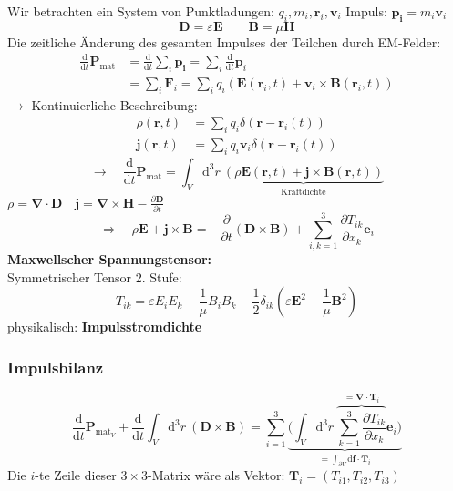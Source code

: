 \documentclass[titlepage,11pt,a4paper,ngerman]{report}
\newcommand{\tx}[1]{\textrm{#1}}
\newcommand{\ub}[1]{\underbrace{#1}}
\newcommand{\ob}[1]{\overbrace{#1}}
\newcommand{\dd}{\tx{d}}
\newcommand{\prt}[2]{\frac{\partial #1}{\partial #2}}
\newcommand{\prd}[2]{\frac{\tx{d} #1}{\tx{d} #2}}
\renewcommand{\vec}[1]{\boldsymbol{#1}}
\renewcommand{\epsilon}{\varepsilon}
\newcommand{\vabla}{\boldsymbol{\nabla}}
\begin{document}
Wir betrachten ein System von Punktladungen: $ q_i, m_i, \vec{r}_i, \vec{v}_i $
Impuls: $ \vec{p_i} = m_i \vec{v}_i $
\begin{equation*}
\vec{D} = \epsilon \vec{E} \qquad \vec{B} = \mu \vec{H}
\end{equation*}
Die zeitliche Änderung des gesamten Impulses der Teilchen durch EM-Felder:
\begin{align*}
\prd{}{t} \vec{P}_{\tx{mat}} &= \prd{}{t} \sum_i \vec{p_i} = \sum_i \prd{}{t} \vec{p}_i\\
&= \sum_i \vec{F}_i = \sum_i q_i \left(\vec{E}(\vec{r}_i, t) + \vec{v}_i \times \vec{B}(\vec{r}_i, t)\right)
\end{align*}
$ \rightarrow $ Kontinuierliche Beschreibung:
\begin{align*}
\rho(\vec{r},t) &= \sum_i q_i \delta(\vec{r} - \vec{r}_i(t))\\
\vec{j}(\vec{r},t) &= \sum_i q_i \vec{v}_i \delta(\vec{r} - \vec{r}_i(t))
\end{align*}
\begin{equation*}
\rightarrow \quad \prd{}{t} \vec{P}_{\tx{mat}} = \int_V \dd^3 r \ \ub{\left(\rho \vec{E}(\vec{r},t) + \vec{j} \times \vec{B}(\vec{r},t)\right)}_{\tx{Kraftdichte}}
\end{equation*}
$ \rho = \vabla \cdot \vec{D} \quad \vec{j} = \vabla \times \vec{H} - \prt{\vec{D}}{t} $
\begin{equation*}
\Rightarrow \quad \rho \vec{E} + \vec{j} \times \vec{B} = - \prt{}{t} (\vec{D} \times \vec{B}) + \sum_{i,k=1}^{3} \prt{T_{ik}}{x_k} \vec{e}_i
\end{equation*}
\textbf{Maxwellscher Spannungstensor:}\\[5pt]
Symmetrischer Tensor 2. Stufe:
\begin{equation*}
T_{ik} = \epsilon E_i E_k - \frac{1}{\mu} B_i B_k - \frac{1}{2} \delta_{ik}(\epsilon \vec{E}^2 - \frac{1}{\mu} \vec{B}^2)
\end{equation*}
physikalisch: \textbf{Impulsstromdichte}

\subsubsection{Impulsbilanz}

\begin{equation*}
\prd{}{t} \vec{P}_{\tx{mat}_V} + \prd{}{t} \int_V \dd^3 r \ (\vec{D} \times \vec{B}) = \sum_{i=1}^{3} \ub{\Bigg(\int_{V} \dd^3 r\ \ob{\sum_{k=1}^{3} \prt{T_{ik}}{x_k}}^{= \vabla \cdot \vec{T}_i} \vec{e}_i \Bigg)}_{= \int_{\partial V} \dd \vec{f} \cdot \vec{T}_i}
\end{equation*}
Die $ i $-te Zeile dieser $ 3 \times 3 $-Matrix wäre als Vektor: $ \vec{T}_i = (T_{i1}, T_{i2}, T_{i3}) $
\end{document}
